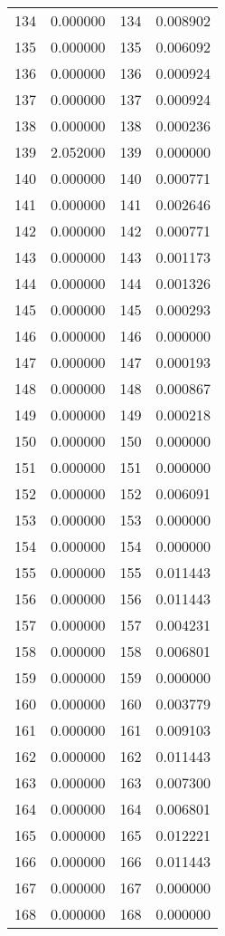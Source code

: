 \documentclass[12pt]{article}
\begin{document}
\begin{longtable}{@{}cccc@{}}
134 & 0.000000 & 134 & 0.008902 \\
135 & 0.000000 & 135 & 0.006092 \\
136 & 0.000000 & 136 & 0.000924 \\
137 & 0.000000 & 137 & 0.000924 \\
138 & 0.000000 & 138 & 0.000236 \\
139 & 2.052000 & 139 & 0.000000 \\
140 & 0.000000 & 140 & 0.000771 \\
141 & 0.000000 & 141 & 0.002646 \\
142 & 0.000000 & 142 & 0.000771 \\
143 & 0.000000 & 143 & 0.001173 \\
144 & 0.000000 & 144 & 0.001326 \\
145 & 0.000000 & 145 & 0.000293 \\
146 & 0.000000 & 146 & 0.000000 \\
147 & 0.000000 & 147 & 0.000193 \\
148 & 0.000000 & 148 & 0.000867 \\
149 & 0.000000 & 149 & 0.000218 \\
150 & 0.000000 & 150 & 0.000000 \\
151 & 0.000000 & 151 & 0.000000 \\
152 & 0.000000 & 152 & 0.006091 \\
153 & 0.000000 & 153 & 0.000000 \\
154 & 0.000000 & 154 & 0.000000 \\
155 & 0.000000 & 155 & 0.011443 \\
156 & 0.000000 & 156 & 0.011443 \\
157 & 0.000000 & 157 & 0.004231 \\
158 & 0.000000 & 158 & 0.006801 \\
159 & 0.000000 & 159 & 0.000000 \\
160 & 0.000000 & 160 & 0.003779 \\
161 & 0.000000 & 161 & 0.009103 \\
162 & 0.000000 & 162 & 0.011443 \\
163 & 0.000000 & 163 & 0.007300 \\
164 & 0.000000 & 164 & 0.006801 \\
165 & 0.000000 & 165 & 0.012221 \\
166 & 0.000000 & 166 & 0.011443 \\
167 & 0.000000 & 167 & 0.000000 \\
168 & 0.000000 & 168 & 0.000000 \\

\end{longtable}
\end{document}
